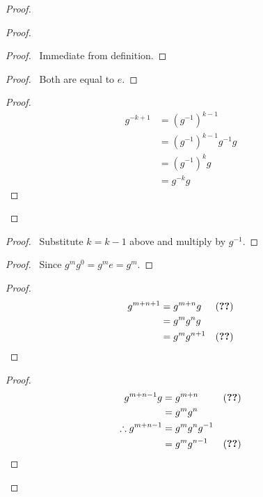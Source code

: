 \documentclass{book}
\let\qed\relax
\theoremstyle{definition}
\begin{document}
\begin{proof}
    \pf
    \begin{proof}
        \begin{proof}
            \pf\ Immediate from definition.
        \end{proof}
        \begin{proof}
            \pf\ Both are equal to $e$.
        \end{proof}
        \begin{proof}
            \pf
            \begin{align*}
                g^{-k+1} & = (g^{-1})^{k-1}          \\
                         & = (g^{-1})^{k-1} g^{-1} g \\
                         & = (g^{-1})^k g            \\
                         & = g^{-k} g
            \end{align*}
        \end{proof}
    \end{proof}
    \begin{proof}
        \pf\ Substitute $k = k-1$ above and multiply by $g^{-1}$.
    \end{proof}
    \begin{proof}
        \pf\ Since $g^m g^0 = g^m e = g^m$.
    \end{proof}
    \begin{proof}
        \pf
        \begin{align*}
            g^{m+n+1} & = g^{m+n} g   & (\text{\stepref{1}}) \\
                      & = g^m g^n g                          \\
                      & = g^m g^{n+1} & (\text{\stepref{1}})
        \end{align*}
    \end{proof}
    \begin{proof}
        \pf
        \begin{align*}
            g^{m+n-1} g          & = g^{m+n}        & (\text{\stepref{1}}) \\
                                 & = g^m g^n                               \\
            \therefore g^{m+n-1} & = g^m g^n g^{-1}                        \\
                                 & = g^m g^{n-1}    & (\text{\stepref{2}})
        \end{align*}
    \end{proof}
    \qed
\end{proof}
\end{document}
